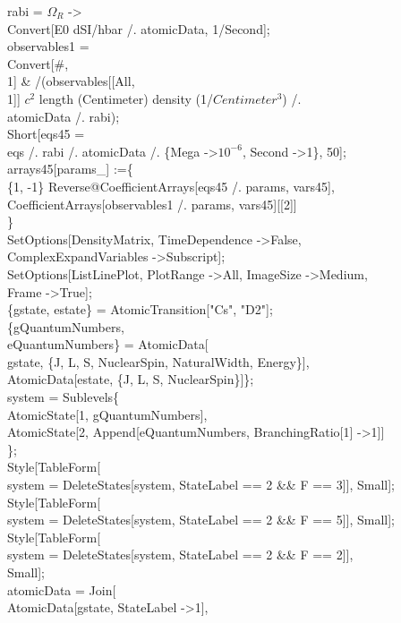 \begin{enumerate}
rabi = $\Omega_R$ -\textgreater \\
   Convert[E0 dSI/hbar /. atomicData, 1/Second];\\
observables1 = \\
  Convert[\#, \\
     1] \& /\@ (observables[[All, \\
        1]] $c^2$ length (Centimeter) density (1/$Centimeter^3$) /. \\
      atomicData /. rabi);\\
Short[eqs45 = \\
   eqs /. rabi /. atomicData /. \{Mega -\textgreater $10^{-6}$, Second -\textgreater 1\}, 50];\\
arrays45[params\_] :=\{\\
  \{1, -1\} Reverse@CoefficientArrays[eqs45 /. params, vars45], \\
  CoefficientArrays[observables1 /. params, vars45][[2]]\\
  \} \\
SetOptions[DensityMatrix, TimeDependence -\textgreater False, \\
  ComplexExpandVariables -\textgreater Subscript];\\
SetOptions[ListLinePlot, PlotRange -\textgreater All, ImageSize -\textgreater Medium, \\
  Frame -\textgreater True];\\
\{gstate, estate\} = AtomicTransition["Cs", "D2"];\\
\{gQuantumNumbers, \\
   eQuantumNumbers\} = {AtomicData[\\
    gstate, \{J, L, S, NuclearSpin, NaturalWidth, Energy\}],\\
   AtomicData[estate, \{J, L, S, NuclearSpin\}]\};\\
system = Sublevels\@\{\\
    AtomicState[1, gQuantumNumbers], \\
    AtomicState[2, Append[eQuantumNumbers, BranchingRatio[1] -\textgreater 1]]\\
    \};\\
Style[TableForm[\\
   system = DeleteStates[system, StateLabel == 2 \&\& F == 3]], Small];\\
Style[TableForm[\\
   system = DeleteStates[system, StateLabel == 2 \&\& F == 5]], Small];\\
Style[TableForm[\\
   system = DeleteStates[system, StateLabel == 2 \&\& F == 2]],\\
  Small];\\
atomicData = Join[\\
   AtomicData[gstate, StateLabel -\textgreater 1],\\
   
}
\end{enumerate}
